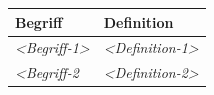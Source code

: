 \documentclass[]{article}
\begin{document}
\begin{longtable}[]{@{}ll@{}}
\toprule
\begin{minipage}[b]{0.31\columnwidth}\raggedright\strut
Begriff\strut
\end{minipage} & \begin{minipage}[b]{0.63\columnwidth}\raggedright\strut
Definition\strut
\end{minipage}\tabularnewline
\midrule
\endhead
\begin{minipage}[t]{0.31\columnwidth}\raggedright\strut
\emph{\textless{}Begriff-1\textgreater{}}\strut
\end{minipage} & \begin{minipage}[t]{0.63\columnwidth}\raggedright\strut
\emph{\textless{}Definition-1\textgreater{}}\strut
\end{minipage}\tabularnewline
\begin{minipage}[t]{0.31\columnwidth}\raggedright\strut
\emph{\textless{}Begriff-2}\strut
\end{minipage} & \begin{minipage}[t]{0.63\columnwidth}\raggedright\strut
\emph{\textless{}Definition-2\textgreater{}}\strut
\end{minipage}\tabularnewline
\bottomrule
\end{longtable}
\end{document}
